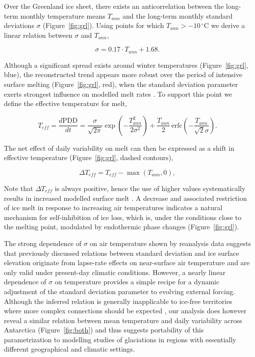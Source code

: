 \documentclass[review]{igs}
\begin{document}
Over the Greenland ice sheet, there exists an anticorrelation between the long-term monthly temperature means $T_{ann}$ and the long-term monthly standard deviations $\sigma$ (Figure~\ref{fig:grl}). Using points for which $T_{ann}>-10\,^\circ$C we derive a linear relation between $\sigma$ and $T_{ann}$,

\begin{equation} \label{eq:sigma}
    \sigma = 0.17 \cdot T_{ann} + 1.68.
\end{equation}

Although a significant spread exists around winter temperatures (Figure~\ref{fig:grl}, blue), the reconstructed trend appears more robust over the period of intensive surface melting (Figure~\ref{fig:grl}, red), when the standard deviation parameter exerts strongest influence on modelled melt rates \citep{rogozhina-rau-inpress}. To support this point we define the effective temperature for melt,

\begin{equation} \label{eq:teff}
    T_{eff} = \frac{d\mathrm{PDD}}{dt}
        = \frac{\sigma}{\sqrt{2\pi}} \exp\left({-\frac{T_{ann}^2}{2\sigma^2}}\right)
            + \frac{T_{ann}}{2} \, \mathrm{erfc} \left(-\frac{T_{ann}}{\sqrt{2}\sigma}\right).
\end{equation}

The net effect of daily variability on melt can then be expressed as a shift in effective temperature (Figure~\ref{fig:grl}, dashed contours),

\begin{equation} \label{eq:dteff}
    \Delta T_{eff} = T_{eff} - \max(T_{ann}, 0),
\end{equation}

Note that $\Delta T_{eff}$ is always positive, hence the use of higher values systematically results in increased modelled surface melt \citep{rogozhina-rau-inpress}. A decrease and associated restriction of ice melt in response to increasing air temperatures indicates a natural mechanism for self-inhibition of ice loss, which is, under the conditions close to the melting point, modulated by endothermic phase changes (Figure~\ref{fig:grl}).

The strong dependence of $\sigma$ on air temperature shown by reanalysis data suggests that previously discussed relations between standard deviation and ice surface elevation \citep{fausto-etal-2009,fausto-etal-2011} originate from lapse-rate effects on near-surface air temperature and are only valid under present-day climatic conditions. However, a nearly linear dependence of $\sigma$ on temperature provides a simple recipe for a dynamic adjustment of the standard deviation parameter to evolving external forcing. Although the inferred relation is generally inapplicable to ice-free territories where more complex connections should be expected \citep{seguinot-2013}, our analysis does however reveal a similar relation between mean temperature and daily variability across Antarctica (Figure~\ref{fig:both}) and thus suggests portability of this parametrization to modelling studies of glaciations in regions with essentially different geographical and climatic settings.
\end{document}
